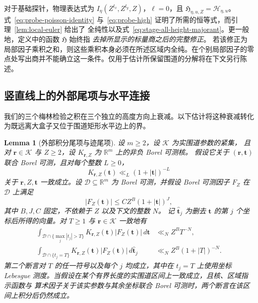 \documentclass[11pt,a4paper]{article}
\numberwithin{equation}{section}
\numberwithin{figure}{section}
\newtheorem{lemma}[theorem]{Lemma}
\theoremstyle{definition}
\theoremstyle{remark}
\begin{document}
对于基础探针，物理表达式为
$I_\eta(Z^{l_x},Z^{l_y},Z)$，$\ell=0$，且
$\mathfrak H_{\eta,u,Z}=\mathcal H_{\eta,u}$。
式~\eqref{eq:probe-poisson-identity} 与~\eqref{eq:probe-high}
证明了所需的恒等式，而引理~\ref{lem:local-euler} 给出了
全纯性以及式~\eqref{eq:stage-all-height-majorant}。更一般地，定义中的函数 $\mathfrak H$ 始终指
\emph{去掉所显示的标量商之后的完整修正}。
若该修正为局部因子乘积之和，则这些乘积本身必须在所述区域内全纯。在个别局部因子的零点处写出商并不能确立这一条件。仅用于估计所保留围道的分解将在下文另行陈述。

\subsection{竖直线上的外部尾项与水平连接}

我们的三个梅林检验之积在三个独立的高度方向上衰减。以下估计将这种衰减转化为既远离大盒子又位于围道矩形水平边上的界。\begin{lemma}[外部积分尾项与迹尾项]
\label{lem:external-contour-tails}
设 $m\ge2$，设 $\mathcal K$ 为实围道参数的紧集，
且对 $\boldsymbol r\in\mathcal K$ 与 $Z\ge2$，设
$K_{\boldsymbol r,Z}$ 为 $\mathbb R^m$ 上的非负 Borel 可测核。
假设它关于 $(\boldsymbol r,\boldsymbol t)$ 联合 Borel 可测，且对每个整数 $L\ge0$，
\[
 K_{\boldsymbol r,Z}(\boldsymbol t)
 \ll_L(1+|\boldsymbol t|)^{-L}
\]
关于 $\boldsymbol r,Z,\boldsymbol t$ 一致成立。设
$\mathcal D\subseteq\mathbb R^m$ 为 Borel 可测，并假设 Borel
可测因子 $F_Z$ 在 $\mathcal D$ 上满足
\begin{equation}
 |F_Z(\boldsymbol t)|\le C Z^B(1+|\boldsymbol t|)^J,
 \label{eq:external-arithmetic-majorant}
\end{equation}
其中 $B,J,C$ 固定，不依赖于 $Z$ 以及下文的整数 $N$。
记 $\widehat{\boldsymbol t}_j$ 为删去 $\boldsymbol t$ 的第
$j$ 个坐标后所得的向量。对 $T\ge1$ 与
$\boldsymbol r\in\mathcal K$ 一致地有
\begin{align}
 \int_{\mathcal D\cap\{\max_j|t_j|>T\}}
 K_{\boldsymbol r,Z}(\boldsymbol t)|F_Z(\boldsymbol t)|\,d\boldsymbol t
 &\ll_N Z^B T^{-N},
 \label{eq:external-integrated-tail}\\
 \int_{\mathcal D\cap\{t_j=T\}}
 K_{\boldsymbol r,Z}(\boldsymbol t)|F_Z(\boldsymbol t)|\,
 d\widehat{\boldsymbol t}_j
 &\ll_N Z^B(1+|T|)^{-N}.
 \label{eq:external-trace-tail}
\end{align}
第二个断言对 $T$ 的任一符号以及每个 $j$ 均成立，其中在
$t_j=T$ 上使用坐标 Lebesgue 测度。当假设在某个有界长度的实围道区间上一致成立，且核、区域指示函数与
算术因子关于该实参数与其余坐标联合 Borel 可测时，两个断言在该区间上积分后仍然成立。
\end{lemma}
\end{document}
